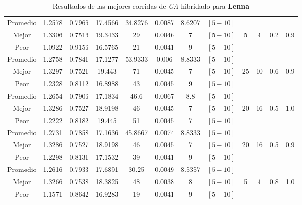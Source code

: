 \begin{table}[h!]
\begin{center}
\begin{tabular}{|c|c|c|c|c|c|c|c|c|c|c|c|}
        \hline
            Promedio  & 1.2578 & 0.7966 & 17.4566 & 34.8276 & 0.0087 & 8.6207 & $[5-10]$ &  &  &  & \\
            \cline{1-8}
            Mejor & 1.3306 & 0.7516  & 19.3433 & 29 & 0.0046 & 7 & $[5-10]$ & 5 & 4 & 0.2 & 0.9\\
            \cline{1-8}
            Peor & 1.0922 & 0.9156  & 16.5765 & 21 & 0.0041 & 9 & $[5-10]$ &  &  &  & \\
        \hline
        \hline
            Promedio  & 1.2758 & 0.7841 & 17.1277 & 53.9333 & 0.006 & 8.8333 & $[5-10]$ &  &  &  & \\
            \cline{1-8}
            Mejor & 1.3297 & 0.7521  & 19.443 & 71 & 0.0045 & 7 & $[5-10]$ & 25 & 10 & 0.6 & 0.9\\
            \cline{1-8}
            Peor & 1.2328 & 0.8112  & 16.8988 & 43 & 0.0045 & 9 & $[5-10]$ &  &  &  & \\
        \hline
        \hline
            Promedio  & 1.2654 & 0.7906 & 17.1834 & 46.6 & 0.0067 & 8.8 & $[5-10]$ &  &  &  & \\
            \cline{1-8}
            Mejor & 1.3286 & 0.7527  & 18.9198 & 46 & 0.0045 & 7 & $[5-10]$ & 20 & 16 & 0.5 & 1.0\\
            \cline{1-8}
            Peor & 1.2222 & 0.8182  & 19.445 & 51 & 0.0045 & 7 & $[5-10]$ &  &  &  & \\
        \hline
        \hline
            Promedio  & 1.2731 & 0.7858 & 17.1636 & 45.8667 & 0.0074 & 8.8333 & $[5-10]$ &  &  &  & \\
            \cline{1-8}
            Mejor & 1.3286 & 0.7527  & 18.9198 & 46 & 0.0045 & 7 & $[5-10]$ & 20 & 16 & 0.5 & 0.9\\
            \cline{1-8}
            Peor & 1.2298 & 0.8131  & 17.1532 & 39 & 0.0041 & 9 & $[5-10]$ &  &  &  & \\
        \hline
        \hline
            Promedio  & 1.2616 & 0.7933 & 17.6891 & 30.25 & 0.0049 & 8.5357 & $[5-10]$ &  &  &  & \\
            \cline{1-8}
            Mejor & 1.3266 & 0.7538  & 18.3825 & 48 & 0.0038 & 8 & $[5-10]$ & 5 & 4 & 0.8 & 1.0\\
            \cline{1-8}
            Peor & 1.1571 & 0.8642  & 16.9283 & 19 & 0.0041 & 9 & $[5-10]$ &  &  &  & \\
        \hline
        \end{tabular}
        \caption{Resultados de las mejores corridas de \emph{GA} hibridado para {\bf Lenna}}
        \label{tb:tablegahibimg}
    \end{center}
\end{table}


